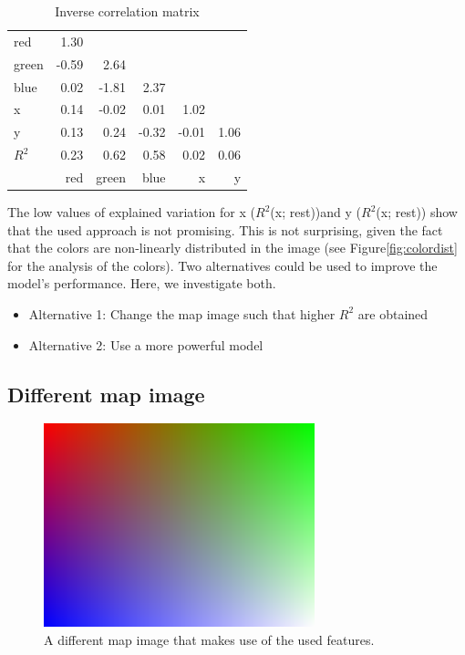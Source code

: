 \documentclass{article}
\begin{document}
\begin{table}                                   
\centering                                      
\begin{tabular}{l|rrrrr}                    
    red   & 1.30  &       &       &       &      \\  
    green & -0.59 & 2.64  &       &       &      \\
    blue  & 0.02  & -1.81 & 2.37  &       &      \\ 
    x     & 0.14  & -0.02 & 0.01  & 1.02  &      \\ 
    y     & 0.13  & 0.24  & -0.32 & -0.01 & 1.06 \\ 
  \midrule
  $R^2$   & 0.23  & 0.62  & 0.58  & 0.02  & 0.06 \\
  \midrule
          & red   & green & blue  & x     & y
\end{tabular}                                   
\caption{Inverse correlation matrix}                        
\label{table:MyTableLabel}                      
\end{table} 

The low values of explained variation for x ($R^2$(x; rest))and y
($R^2$(x; rest)) show that the used approach is not promising. This is
not surprising, given the fact that the colors are non-linearly
distributed in the image (see Figure\ref{fig:colordist} for the
analysis of the colors). Two alternatives could be used to improve the
model's performance. Here, we investigate both.
\begin{itemize}
\item Alternative 1: Change the map image such that higher $R^2$ are
  obtained
\item Alternative 2: Use a more powerful model
\end{itemize}

\subsection{Different map image}

\begin{figure}[h]
  \centering
  \includegraphics[width=0.7\textwidth]{gradient}
  \caption{A different map image that makes use of the used features.}
  \label{fig:newmap}
\end{figure}
\end{document}
